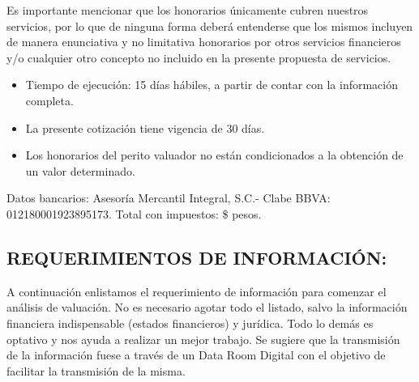 \documentclass[5pt,letter]{article}
\begin{document}
 Es importante mencionar que los honorarios únicamente cubren nuestros servicios, por lo que
de ninguna forma deberá entenderse que los mismos incluyen de manera enunciativa y no
limitativa honorarios por otros servicios financieros y/o cualquier otro concepto no incluido
en la presente propuesta de servicios.\\
 
 \begin{itemize}
\item Tiempo de ejecución: 15 días hábiles, a partir de contar con la información completa.\\
\item  La presente cotización tiene vigencia de 30 días.\\
\item  Los honorarios del perito valuador no están condicionados a la obtención de un valor
determinado.\\
\end{itemize}
 
Datos bancarios: Asesoría Mercantil Integral, S.C.- Clabe BBVA: 012180001923895173.
Total con impuestos: \$\totalMasIva{} pesos.
 
\begin{center}
\section{REQUERIMIENTOS DE INFORMACIÓN:}
\end{center}
 
 A continuación enlistamos el requerimiento de información para comenzar el análisis de valuación. No es necesario agotar todo el listado, salvo la información financiera indispensable (estados financieros) y jurídica. Todo lo demás es optativo y nos ayuda a realizar un mejor trabajo. Se sugiere que la transmisión de la información fuese a través de un Data Room Digital con el objetivo de facilitar la transmisión de la misma.\\
 
\end{document}
